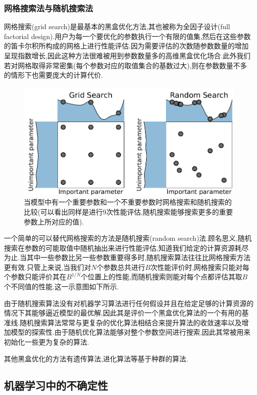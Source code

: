 \documentclass{ctexart}
\begin{document}
\subsubsection{网格搜索法与随机搜索法}
网格搜索(grid search)是最基本的黑盒优化方法,其也被称为全因子设计(full factorial design).用户为每一个要优化的参数执行一个有限的值集,然后在这些参数的笛卡尔积所构成的网格上进行性能评估.因为需要评估的次数随参数数量的增加呈现指数增长,因此这种方法很难被用到参数数量多的高维黑盒优化场合.此外我们若对网格取得非常密集(每个参数对应的取值集合的基数过大),则在参数数量不多的情形下也需要庞大的计算代价.\cite{automl}

\begin{figure}[htb!]
	\centering
	\includegraphics[scale=0.55]{search.png}
	\caption{当模型中有一个重要参数和一个不重要参数时网格搜索和随机搜索的比较(可以看出同样是进行9次性能评估,随机搜索能够搜索更多的重要参数上所对应的值).}
\end{figure}
一个简单的可以替代网格搜索的方法是随机搜索(random search)法.顾名思义,随机搜索在参数的可能取值中随机抽出来进行性能评估,知道我们给定的计算资源耗尽为止.当其中一些参数比另一些参数重要得多时,随机搜索算法往往比网格搜索方法更有效.只管上来说,当我们对$N$个参数总共进行$B$次性能评价时,网格搜索只能对每个参数只能评价其在$B^{1/N}$个位置上的性能,而随机搜索则能对每个点都评估其取$B$个不同值的性能.这一示意图如下所示.


由于随机搜索算法没有对机器学习算法进行任何假设并且在给定足够的计算资源的情况下其能够逼近模型的最优解,因此其是评价一个黑盒优化算法的一个有用的基准线.随机搜索算法常常与更复杂的优化算法相结合来提升算法的收敛速率以及增加模型的探索性.由于随机优化算法能够对整个参数空间进行搜索,因此其常被用来初始化一些更为复杂的算法.

其他黑盒优化的方法有遗传算法,进化算法等基于种群的算法.


\subsection{机器学习中的不确定性}
\end{document}
